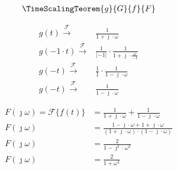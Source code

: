\begin{task}
\begin{align*}
\TimeScalingTeorem{g}{G}{f}{F}
\end{align*}

\begin{align*}
g(t) \xrightarrow{\mathcal F} & \frac{1}{ 1 + \jmath \cdot \omega}\\
g(-1 \cdot t) \xrightarrow{\mathcal F} & \frac{1}{\left|-1\right|} \cdot \frac{1}{ 1 + \jmath \cdot \frac{\omega}{-1}}\\
g(-t) \xrightarrow{\mathcal F} & \frac{1}{1} \cdot \frac{1}{ 1 - \jmath \cdot \omega}\\
g(-t) \xrightarrow{\mathcal F} & \frac{1}{ 1 - \jmath \cdot \omega}
\end{align*}



\begin{align*}
F(\jmath \omega) = \mathcal F\{f(t)\} & = \frac{1}{ 1 + \jmath \cdot \omega} + \frac{1}{ 1 - \jmath \cdot \omega}\\
F(\jmath \omega) & = \frac{1 - \jmath \cdot \omega + 1 + \jmath \cdot \omega}{ (1 + \jmath \cdot \omega) \cdot (1 - \jmath \cdot \omega)}\\
F(\jmath \omega) & = \frac{2}{1 - \jmath^2 \cdot \omega^2}\\
F(\jmath \omega) & = \frac{2}{1 + \omega^2}
\end{align*}


\end{task}
